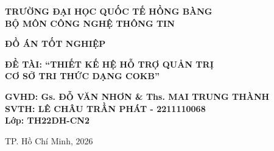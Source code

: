 \documentclass[13pt,a4paper,oneside]{report}
\begin{document}
\begin{titlepage}
    \centering
    \textbf{TRƯỜNG ĐẠI HỌC QUỐC TẾ HỒNG BÀNG}\\
    \textbf{BỘ MÔN CÔNG NGHỆ THÔNG TIN}\\
    \vspace{4cm}
    {\Huge \textbf{ĐỒ ÁN TỐT NGHIỆP}\par}
    \vspace{2cm}
    {\huge \textbf{ĐỀ TÀI: “THIẾT KẾ HỆ HỖ TRỢ QUẢN TRỊ \\ CƠ SỞ TRI THỨC DẠNG COKB”}\par}
    \vspace{4cm}
    \begin{flushleft}
    \textbf{GVHD: Gs. ĐỖ VĂN NHƠN \& Ths. MAI TRUNG THÀNH}\\
    \textbf{SVTH: LÊ CHÂU TRẦN PHÁT - 2211110068}\\
    \textbf{Lớp: TH22DH-CN2}
    \end{flushleft}
    \vfill
    {\large TP. Hồ Chí Minh, 2026\par}
\end{titlepage}
\tableofcontents
\listoffigures
\listoftables


















\end{document}
